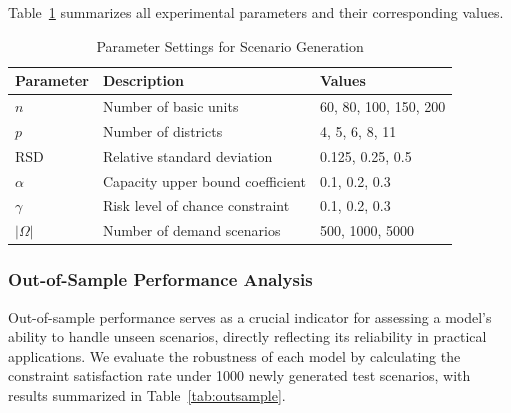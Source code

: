 \documentclass[preprint,12pt,authoryear]{elsarticle}
\begin{document}
Table~\ref{tab:params} summarizes all experimental parameters and their corresponding values.

\begin{table}[H]
\centering
\caption{Parameter Settings for Scenario Generation}
\label{tab:params}
\begin{tabular}{lll}
\toprule
\textbf{Parameter} & \textbf{Description} & \textbf{Values} \\
\midrule
$n$ & Number of basic units & 60, 80, 100, 150, 200 \\
$p$ & Number of districts & 4, 5, 6, 8, 11 \\
$\mathrm{RSD}$ & Relative standard deviation & 0.125, 0.25, 0.5 \\
$\alpha$ & Capacity upper bound coefficient & 0.1, 0.2, 0.3 \\
$\gamma$ & Risk level of chance constraint & 0.1, 0.2, 0.3 \\
$|\Omega|$ & Number of demand scenarios & 500, 1000, 5000 \\
\bottomrule
\end{tabular}
\end{table}

\subsubsection{Out-of-Sample Performance Analysis}
Out-of-sample performance serves as a crucial indicator for assessing a model’s ability to handle unseen scenarios, directly reflecting its reliability in practical applications. We evaluate the robustness of each model by calculating the constraint satisfaction rate under 1000 newly generated test scenarios, with results summarized in Table~\ref{tab:outsample}.

\begin{table}[H]
\centering
\caption{Comparison of Average Out-of-Sample Performance across Four Models}
\label{tab:outsample}
\end{table}
\end{document}
